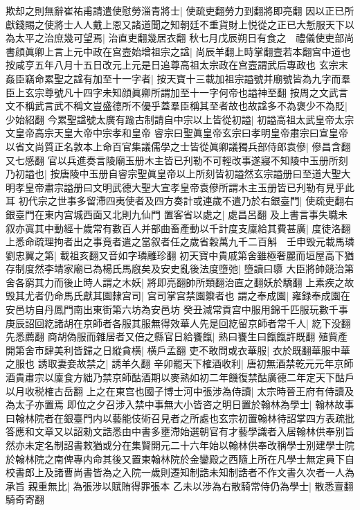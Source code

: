 欺却之則無辭崔祐甫請遣使慰勞淄青將士|{
	使疏吏翻勞力到翻將即亮翻}
因以正已所獻錢賜之使將士人人戴上恩又諸道聞之知朝廷不重貨財上悦從之正已大慙服天下以為太平之治庶幾可望焉|{
	治直吏翻幾居衣翻}
秋七月戊辰朔日有食之　禮儀使吏部尚書顔眞卿上言上元中政在宫壼始增祖宗之諡|{
	尚辰羊翻上時掌翻壼若本翻宫中道也按咸亨五年八月十五日改元上元是日追尊高祖太宗政在宫壼謂武后專政也}
玄宗末姦臣竊命累聖之諡有加至十一字者|{
	按天寶十三載加祖宗謚號并廟號皆為九字而羣臣上玄宗尊號凡十四字未知顔眞卿所謂加至十一字何帝也謚神至翻}
按周之文武言文不稱武言武不稱文豈盛德所不優乎蓋羣臣稱其至者故也故諡多不為褒少不為貶|{
	少始紹翻}
今累聖諡號太廣有踰古制請自中宗以上皆從初謚|{
	初謚高祖太武皇帝太宗文皇帝高宗天皇大帝中宗孝和皇帝}
睿宗曰聖眞皇帝玄宗曰孝明皇帝肅宗曰宣皇帝以省文尚質正名敦本上命百官集議儒學之士皆從眞卿議獨兵部侍郎袁傪|{
	傪昌含翻又七感翻}
官以兵進奏言陵廟玉册木主皆已刋勒不可輕改事遂寢不知陵中玉册所刻乃初謚也|{
	按唐陵中玉册自睿宗聖眞皇帝以上所刻皆初謚然玄宗謚册曰至道大聖大明孝皇帝肅宗謚册曰文明武德大聖大宣孝皇帝袁傪所謂木主玉册皆已刋勒有見乎此耳}
初代宗之世事多留滯四夷使者及四方奏計或連歲不遣乃於右銀臺門|{
	使疏吏翻右銀臺門在東内宫城西面又北則九仙門}
置客省以處之|{
	處昌呂翻}
及上書言事失職未叙亦寘其中動經十歲常有數百人并部曲畜產動以千計度支廩給其費甚廣|{
	度徒洛翻}
上悉命疏理拘者出之事竟者遣之當叙者任之歲省穀萬九千二百斛　壬申毁元載馬璘劉忠翼之第|{
	載祖亥翻又音如字璘離珍翻}
初天寶中貴戚第舍雖極奢麗而垣屋高下猶存制度然李靖家廟已為楊氏馬廐矣及安史亂後法度墮弛|{
	墮讀曰隳}
大臣將帥競治第舍各窮其力而後止時人謂之木妖|{
	將即亮翻帥所類翻治直之翻妖於驕翻}
上素疾之故毁其尤者仍命馬氏獻其園隸宫司|{
	宫司掌宫禁園籞者也}
謂之奉成園|{
	雍録奉成園在安邑坊自丹鳳門南出東街第六坊為安邑坊}
癸丑減常貢宫中服用錦千匹服玩數千事　庚辰詔回紇諸胡在京師者各服其服無得效華人先是回紇留京師者常千人|{
	紇下没翻先悉薦翻}
商胡偽服而雜居者又倍之縣官日給饔餼|{
	熟曰饔生曰餼餼許既翻}
殖貲產開第舍市肆美利皆歸之日縱貪横|{
	横戶孟翻}
吏不敢問或衣華服|{
	衣於既翻華服中華之服也}
誘取妻妾故禁之|{
	誘羊久翻}
辛卯罷天下榷酒收利|{
	唐初無酒禁乾元元年京師酒貴肅宗以廩食方絀乃禁京師酤酒期以麥熟如初二年饑復禁酤廣德二年定天下酤戶以月收税榷古岳翻}
上之在東宫也國子博士河中張涉為侍讀|{
	太宗時晉王府有侍讀及為太子亦置焉}
即位之夕召涉入禁中事無大小皆咨之明日置於翰林為學士|{
	翰林故事曰翰林院者在銀臺門内以藝能伎術召見者之所處也玄宗初置翰林待詔掌四方表疏批答應和文章又以詔勑文誥悉由中書多壅滯始選朝官有才藝學識者入居翰林供奉别旨然亦未定名制詔書敕猶或分在集賢開元二十六年始以翰林供奉改稱學士别建學士院於翰林院之南俾專内命其後又置東翰林院於金鑾殿之西隨上所在凡學士無定員下自校書郎上及諸曹尚書皆為之入院一歲則遷知制誥未知制誥者不作文書久次者一人為承旨}
親重無比|{
	為張涉以賦賄得罪張本}
乙未以涉為右散騎常侍仍為學士|{
	散悉亶翻騎奇寄翻}


